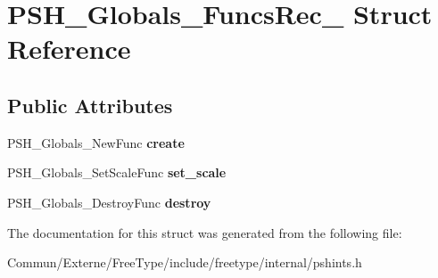 \hypertarget{struct_p_s_h___globals___funcs_rec__}{}\section{P\+S\+H\+\_\+\+Globals\+\_\+\+Funcs\+Rec\+\_\+ Struct Reference}
\label{struct_p_s_h___globals___funcs_rec__}
\subsection*{Public Attributes}
\begin{DoxyCompactItemize}
\item 
P\+S\+H\+\_\+\+Globals\+\_\+\+New\+Func {\bfseries create}\hypertarget{struct_p_s_h___globals___funcs_rec___ac136cec55ea33a2e3b60ffdad20f5420}{}\label{struct_p_s_h___globals___funcs_rec___ac136cec55ea33a2e3b60ffdad20f5420}

\item 
P\+S\+H\+\_\+\+Globals\+\_\+\+Set\+Scale\+Func {\bfseries set\+\_\+scale}\hypertarget{struct_p_s_h___globals___funcs_rec___a9c97456d3f521cb1091f08c2bda27332}{}\label{struct_p_s_h___globals___funcs_rec___a9c97456d3f521cb1091f08c2bda27332}

\item 
P\+S\+H\+\_\+\+Globals\+\_\+\+Destroy\+Func {\bfseries destroy}\hypertarget{struct_p_s_h___globals___funcs_rec___aebb5534f8305a189b09adfebff4f57ba}{}\label{struct_p_s_h___globals___funcs_rec___aebb5534f8305a189b09adfebff4f57ba}

\end{DoxyCompactItemize}


The documentation for this struct was generated from the following file\+:\begin{DoxyCompactItemize}
\item 
Commun/\+Externe/\+Free\+Type/include/freetype/internal/pshints.\+h\end{DoxyCompactItemize}
